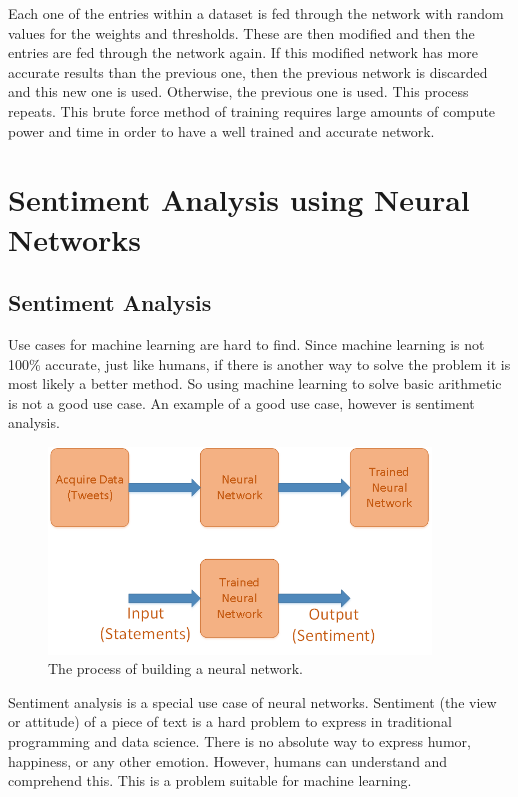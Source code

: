 \documentclass[12pt]{article}
\begin{document}
    Each one of the entries within a dataset is fed through the network with random values for the weights and thresholds. These are then modified and then the entries are fed through the network again. If this modified network has more accurate results than the previous one, then the previous network is discarded and this new one is used. Otherwise, the previous one is used. This process repeats. This brute force method of training requires large amounts of compute power and time in order to have a well trained and accurate network.

    \section{Sentiment Analysis using Neural Networks}
    \subsection{Sentiment Analysis}
    Use cases for machine learning are hard to find. Since machine learning is not 100\% accurate, just like humans, if there is another way to solve the problem it is most likely a better method\autocite{pitfallsML}. So using machine learning to solve basic arithmetic is not a good use case. An example of a good use case, however is sentiment analysis.

    \begin{figure}
        \begin{center}
            \includegraphics[width=4in]{Process.png}
        \end{center}
        \caption{The process of building a neural network.}
        \label{fig:NNProcess}
    \end{figure}

    Sentiment analysis is a special use case of neural networks. Sentiment (the view or attitude) of a piece of text is a hard problem to express in traditional programming and data science. There is no absolute way to express humor, happiness, or any other emotion. However, humans can understand and comprehend this. This is a problem suitable for machine learning.
\end{document}
